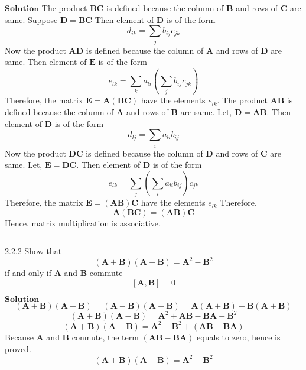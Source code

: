 $\boxed{\textbf{Solution}}$ The product $\mathbf{BC}$ is defined because the column of $\mathbf{B}$ and rows of $\mathbf{C}$ are same.
Suppose $\mathbf{D}=\mathbf{BC}$
Then element of $\mathbf{D}$ is of the form
$$d_{ik}=\sum_{j} b_{ij} c_{j k}$$
Now the product $\mathbf{AD}$ is defined because the column of $\mathbf{A}$ and rows of $\mathbf{D}$ are same. Then element of $\mathbf{E}$ is of the form
$$e_{l k}=\sum_{k} a_{l i}\left(\sum_{j} b_{i j} c_{j k}\right)$$
Therefore, the matrix $\mathbf{E}=\mathbf{A}(\mathbf{B} \mathbf{C})$ have the elements $e_{lk}$. The product $\mathbf{AB}$ is defined because the column of $\mathbf{A}$ and rows of $\mathbf{B}$ are same. Let, $\mathbf{D}=\mathbf{AB}$. Then element of $\mathbf{D}$ is of the form
$$d_{l j}=\sum_{i} a_{li} b_{i j}$$
Now the product $\mathbf{D C}$ is defined because the column of $\mathbf{D}$ and rows of $\mathbf{C}$ are same. Let, $\mathbf{E}=\mathbf{D C}$. Then element of $\mathbf{D}$ is of the form
$$e_{lk}=\sum_{j}\left(\sum_{i} a_{li} b_{i j}\right) c_{j k}$$
Therefore, the matrix $\mathbf{E}=(\mathbf{A} \mathbf{B}) \mathbf{C}$ have the elements $e_{lk}$
Therefore,
$$\mathbf{A}(\mathbf{B} \mathbf{C})=(\mathbf{A} \mathbf{B}) \mathbf{C}$$
Hence, matrix multiplication is associative.

$$$$

\begin{mybox}{2.2.2}
Show that
$$
(\mathbf{A}+\mathbf{B})(\mathbf{A}-\mathbf{B})=\mathbf{A}^{2}-\mathbf{B}^{2}
$$
if and only if $\mathbf{A}$ and $\mathbf{B}$ commute
$$[\mathbf{A}, \mathbf{B}]=0$$
\end{mybox}




$\boxed{\textbf{Solution}}$ 
$$(\mathbf{A}+\mathbf{B})(\mathbf{A}-\mathbf{B})=(\mathbf{A}-\mathbf{B})(\mathbf{A}+\mathbf{B})=\mathbf{A}(\mathbf{A}+\mathbf{B})-\mathbf{B}(\mathbf{A}+\mathbf{B})$$
$$(\mathbf{A}+\mathbf{B})(\mathbf{A}-\mathbf{B})=\mathbf{A}^2+\mathbf{A}\mathbf{B}-\mathbf{B}\mathbf{A}-\mathbf{B}^2$$
$$(\mathbf{A}+\mathbf{B})(\mathbf{A}-\mathbf{B})=\mathbf{A}^2-\mathbf{B}^2+(\mathbf{A}\mathbf{B}-\mathbf{B}\mathbf{A})$$
Because $\mathbf{A}$ and $\mathbf{B}$ conmute, the term $(\mathbf{A}\mathbf{B}-\mathbf{B}\mathbf{A})$ equals to zero, hence is proved.
$$(\mathbf{A}+\mathbf{B})(\mathbf{A}-\mathbf{B})=\mathbf{A}^2 -\mathbf{B}^2$$


\newpage


